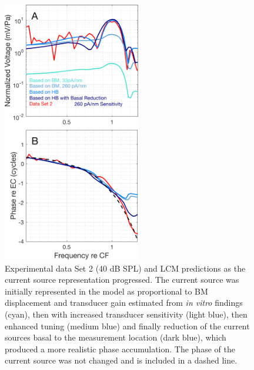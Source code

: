 \documentclass{biophys-new}
\begin{document}
\begin{figure}[h]
\centering
\includegraphics[width = 6cm]{final_figures/finalcom_yi.pdf}
\caption{Experimental data Set 2 (40 dB SPL) and LCM predictions as the current source representation progressed.  The current source was initially represented in the model as proportional to BM displacement and transducer gain estimated from \textit{in vitro} findings (cyan), then with increased transducer sensitivity (light blue), then enhanced tuning (medium blue) and finally reduction of the current sources basal to the measurement location (dark blue), which produced a more realistic phase accumulation. The phase of the current source was not changed and is included in a dashed line.}
\label{finalcomparisonYi}
\end{figure}

\clearpage


\end{document}
